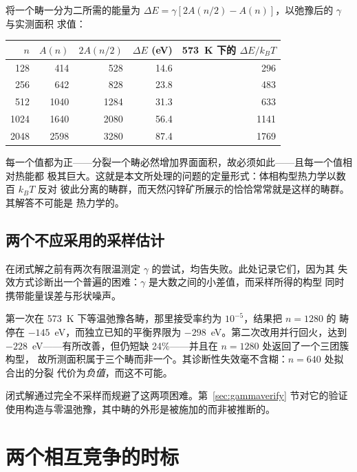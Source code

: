 \documentclass[11pt,a4paper]{ctexart}
\begin{document}
将一个畴一分为二所需的能量为
$\Delta E = \gamma\left[2A(n/2) - A(n)\right]$，以弛豫后的 $\gamma$ 与实测面积
求值：

\begin{center}
\small
\begin{tabular}{rrrrr}
\toprule
$n$ & $A(n)$ & $2A(n/2)$ & $\Delta E$ (eV) & 573~K 下的 $\Delta E / k_BT$ \\
\midrule
128  & 414  & 528  & 14.6 & 296 \\
256  & 642  & 828  & 23.8 & 483 \\
512  & 1040 & 1284 & 31.3 & 633 \\
1024 & 1640 & 2080 & 56.4 & 1141 \\
2048 & 2598 & 3280 & 87.4 & 1769 \\
\bottomrule
\end{tabular}
\end{center}

每一个值都为正——分裂一个畴必然增加界面面积，故必须如此——且每一个值相对热能都
极其巨大。这就是本文所处理的问题的定量形式：体相构型热力学以数百 $k_BT$ 反对
彼此分离的畴群，而天然闪锌矿所展示的恰恰常常就是这样的畴群。其解答不可能是
热力学的。

\subsection{两个不应采用的采样估计}
\label{sec:gammafailed}

在闭式解之前有两次有限温测定 $\gamma$ 的尝试，均告失败。此处记录它们，因为其
失效方式诊断出一个普遍的困难：$\gamma$ 是大数之间的小差值，而采样所得的构型
同时携带能量误差与形状噪声。

第一次在 573~K 下等温弛豫各畴，那里接受率约为 $10^{-5}$，结果把 $n = 1280$ 的
畴停在 $-145$~eV，而独立已知的平衡界限为 $-298$~eV。第二次改用并行回火，达到
$-228$~eV——有所改善，但仍短缺 24\%——并且在 $n = 1280$ 处返回了一个三团簇构型，
故所测面积属于三个畴而非一个。其诊断性失效毫不含糊：$n = 640$ 处拟合出的分裂
代价为\emph{负值}，而这不可能。

闭式解通过完全不采样而规避了这两项困难。第~\ref{sec:gammaverify} 节对它的验证
使用构造与零温弛豫，其中畴的外形是被施加的而非被推断的。

\section{两个相互竞争的时标}
\label{sec:timescales}
\end{document}
